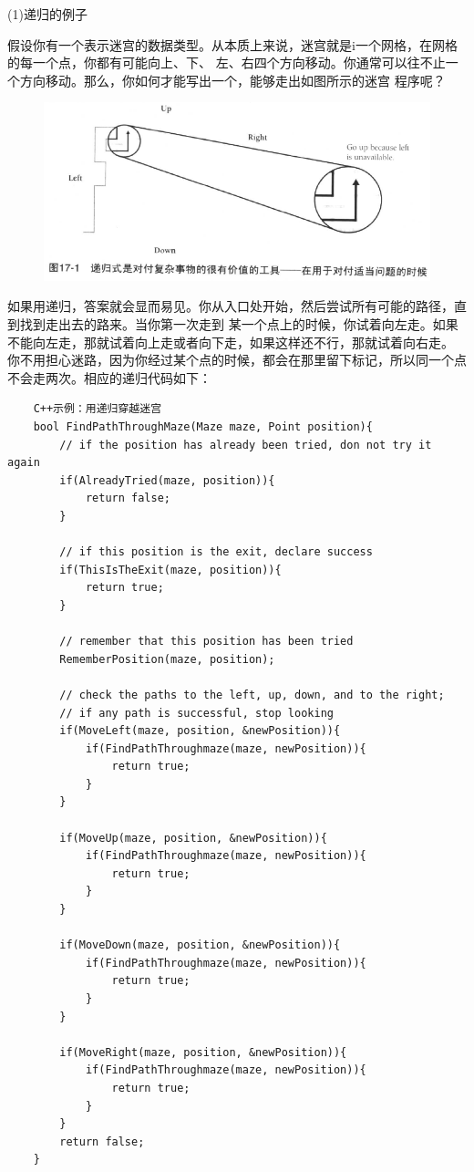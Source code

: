 \documentclass{article}
\begin{document}
\par
(1)递归的例子
\par
假设你有一个表示迷宫的数据类型。从本质上来说，迷宫就是i一个网格，在网格的每一个点，你都有可能向上、下、
左、右四个方向移动。你通常可以往不止一个方向移动。那么，你如何才能写出一个，能够走出如图所示的迷宫
程序呢？
\begin{figure}[htb]
    \centering
    \includegraphics[width=15cm]{figure18.png}
\end{figure}
如果用递归，答案就会显而易见。你从入口处开始，然后尝试所有可能的路径，直到找到走出去的路来。当你第一次走到
某一个点上的时候，你试着向左走。如果不能向左走，那就试着向上走或者向下走，如果这样还不行，那就试着向右走。
你不用担心迷路，因为你经过某个点的时候，都会在那里留下标记，所以同一个点不会走两次。相应的递归代码如下：
\begin{lstlisting}
    C++示例：用递归穿越迷宫
    bool FindPathThroughMaze(Maze maze, Point position){
        // if the position has already been tried, don not try it again
        if(AlreadyTried(maze, position)){
            return false;
        }

        // if this position is the exit, declare success
        if(ThisIsTheExit(maze, position)){
            return true;
        }

        // remember that this position has been tried
        RememberPosition(maze, position);

        // check the paths to the left, up, down, and to the right;
        // if any path is successful, stop looking
        if(MoveLeft(maze, position, &newPosition)){
            if(FindPathThroughmaze(maze, newPosition)){
                return true;
            }
        }

        if(MoveUp(maze, position, &newPosition)){
            if(FindPathThroughmaze(maze, newPosition)){
                return true;
            }
        }

        if(MoveDown(maze, position, &newPosition)){
            if(FindPathThroughmaze(maze, newPosition)){
                return true;
            }
        }

        if(MoveRight(maze, position, &newPosition)){
            if(FindPathThroughmaze(maze, newPosition)){
                return true;
            }
        }
        return false;
    }
\end{lstlisting}
\end{document}
